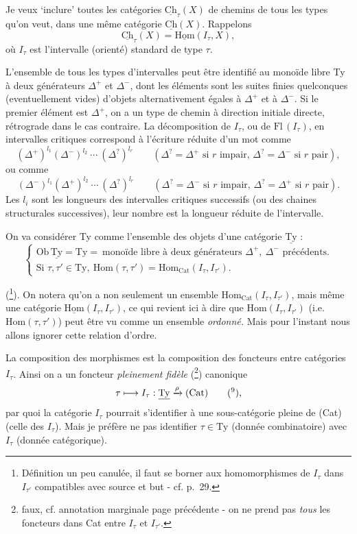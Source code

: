 \documentclass[11pt]{article}
\newcommand{\printedpage}[1]{\if\relax\detokenize{#1}\relax\else\marginpar{\raggedright\footnotesize p.~#1}\fi}
\newcommand{\msp}[1]{\marginpar{\raggedright\footnotesize [#1]}}
\newcommand{\uHom}{\underline{\mathrm{Hom}}}
\newcommand{\Hom}{\mathrm{Hom}}
\newcommand{\uCh}{\underline{\mathrm{Ch}}}
\newcommand{\Ty}{\mathrm{Ty}}
\newcommand{\uTy}{\underline{\mathrm{Ty}}}
\newcommand{\Cat}{\mathrm{Cat}}
\begin{document}
Je veux ‘inclure’ toutes les catégories $\uCh_\tau(X)$ de chemins de tous les types qu'on veut, dans une même catégorie $\uCh(X)$. Rappelons
\[
\uCh_\tau(X)=\uHom(I_\tau,X),
\]
où $I_\tau$ est l'intervalle (orienté) standard de type $\tau$.

L'ensemble de tous les types d'intervalles
\msp{page 25}
peut être identifié au monoïde libre Ty à deux générateurs $\Delta^+$ et $\Delta^-$, dont les éléments sont les suites finies quelconques (eventuellement vides) d'objets alternativement égales à $\Delta^+$ et à $\Delta^-$. Si le premier élément est $\Delta^+$, on a un type de chemin à direction initiale directe, rétrograde dans le cas contraire. La décomposition de $I_\tau$, ou de $\mathrm{Fl}\,(I_\tau)$, en intervalles critiques correspond à l'écriture réduite d'un mot comme %
\[
(\Delta^+)^{l_1}(\Delta^-)^{l_2}\ \cdots\ (\Delta^?)^{l_r} \qquad (\Delta^?=\Delta^+ \text{ si } r \text{ impair, } \Delta^?=\Delta^- \text{ si } r \text{ pair}),
\]
ou comme
\[
(\Delta^-)^{l_1}(\Delta^+)^{l_2}\ \cdots\ (\Delta^?)^{l_r} \qquad (\Delta^?=\Delta^- \text{ si } r \text{ impair, } \Delta^?=\Delta^+ \text{ si } r \text{ pair}).
\]
Les $l_i$ sont les longueurs des intervalles critiques successifs (ou des chaines structurales successives), leur nombre est la longueur réduite de l'intervalle.

On va considérer Ty comme l'ensemble des objets d'une catégorie $\uTy$ :
\[
\left\{
\begin{array}{l}
\mathrm{Ob}\,\uTy=\Ty=\ \text{monoïde libre à deux générateurs } \Delta^+,\ \Delta^- \text{ précédents.}\\[1ex]
\text{Si } \tau,\tau'\in\Ty,\ \Hom(\tau,\tau')=\Hom_{\Cat}(I_\tau,I_{\tau'}).
\end{array}
\right.
\]

(\footnote[7]{Définition un peu canulée, il faut se borner aux homomorphismes de $I_\tau$ dans $I_{\tau'}$ compatibles avec source et but - cf. p.~29.}). On notera qu'on a non seulement un ensemble $\Hom_{\Cat}(I_\tau,I_{\tau'})$, mais même une catégorie $\uHom(I_\tau,I_{\tau'})$, ce qui revient ici à dire que $\Hom(I_\tau,I_{\tau'})$ (i.e. $\Hom(\tau,\tau')$) peut être vu comme un ensemble \textit{ordonné.} Mais pour l'instant nous allons ignorer cette relation d'ordre.

\msp{page 26}
La composition des morphismes est la composition des foncteurs entre catégories $I_\tau$. Ainsi on a un foncteur \textit{pleinement fidèle} (\footnote[8]{faux, cf. annotation marginale page précédente - on ne prend pas \textit{tous} les foncteurs dans Cat entre $I_\tau$ et $I_{\tau'}$.}) canonique
\[
\tau \longmapsto I_\tau : \uTy \xrightarrow{\rho} (\Cat) \qquad \text{(\footnotemark[9]),}
\]
\printedpage{17}
par quoi la catégorie $I_\tau$ pourrait s'identifier à une sous-catégorie pleine de (Cat) (celle des $I_\tau$). Mais je préfère ne pas identifier $\tau\in\Ty$ (donnée combinatoire) avec $I_\tau$ (donnée catégorique).
\end{document}
